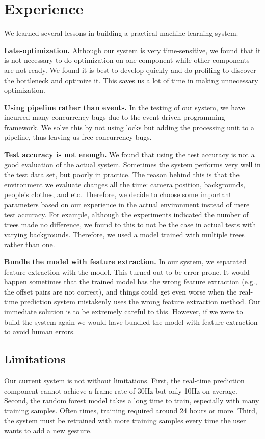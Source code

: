 \section{Experience}
\cutsection
\label{sec: experience}

We learned several lessons in building a practical machine learning system.

\textbf{Late-optimization.} Although our system is very time-sensitive, we found that it is not necessary to do optimization on one component while other components are not ready. We found it is best to develop quickly and do profiling to discover the bottleneck and optimize it. This saves us a lot of time in making unnecessary optimization.   

\textbf{Using pipeline rather than events.} In the testing of our system, we have incurred many concurrency bugs due to the event-driven programming framework. We solve this by not using locks but adding the processing unit to a pipeline, thus leaving us free concurrency bugs.

\textbf{Test accuracy is not enough.} We found that using the test accuracy is not a good evaluation of the actual system. Sometimes the system performs very well in the test data set, but poorly in practice. The reason behind this is that the environment we evaluate changes all the time: camera position, backgrounds, people's clothes, and etc. Therefore, we decide to choose some important parameters based on our experience in the actual environment instead of mere test accuracy. For example, although the experiments indicated the number of trees made no difference, we found to this to not be the case in actual tests with varying backgrounds. Therefore, we used a model trained with multiple trees rather than one.

\textbf{Bundle the model with feature extraction.} In our system, we separated feature extraction with the model. This turned out to be error-prone. It would happen sometimes that the trained model has the wrong feature extraction (e.g., the offset pairs are not correct), and things could get even worse when the real-time prediction system mistakenly uses the wrong feature extraction method. Our immediate solution is to be extremely careful to this. However, if we were to build the system again we would have  bundled the model with feature extraction to avoid human errors.

\subsection{Limitations}
Our current system is not without limitations. First, the real-time prediction component cannot achieve a frame rate of 30Hz but only 10Hz on average. Second, the random forest model takes a long time to train, especially with many training samples. Often times, training required around 24 hours or more. Third, the system must be retrained with more training samples every time the user wants to add a new gesture. 
